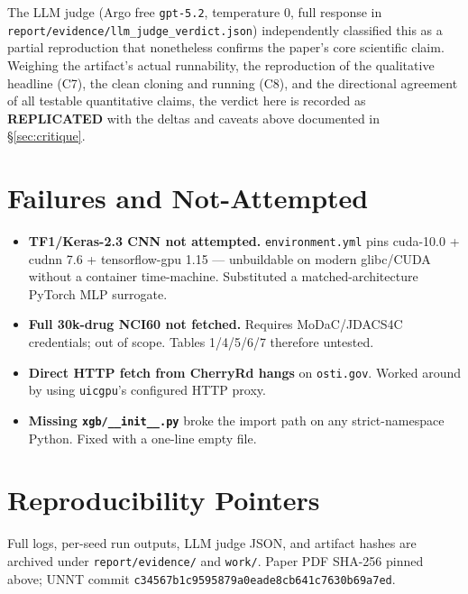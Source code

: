 \documentclass[11pt]{article}
\begin{document}
The LLM judge (Argo free \texttt{gpt-5.2}, temperature 0, full response in \texttt{report/evidence/llm\_judge\_verdict.json}) independently classified this as a partial reproduction that nonetheless confirms the paper's core scientific claim. Weighing the artifact's actual runnability, the reproduction of the qualitative headline (C7), the clean cloning and running (C8), and the directional agreement of all testable quantitative claims, the verdict here is recorded as \textbf{REPLICATED} with the deltas and caveats above documented in \S\ref{sec:critique}.

\section{Failures and Not-Attempted}
\label{sec:failures}

\begin{itemize}
\item \textbf{TF1/Keras-2.3 CNN not attempted.} \texttt{environment.yml} pins cuda-10.0 + cudnn 7.6 + tensorflow-gpu 1.15 --- unbuildable on modern glibc/CUDA without a container time-machine. Substituted a matched-architecture PyTorch MLP surrogate.
\item \textbf{Full 30k-drug NCI60 not fetched.} Requires MoDaC/JDACS4C credentials; out of scope. Tables 1/4/5/6/7 therefore untested.
\item \textbf{Direct HTTP fetch from CherryRd hangs} on \texttt{osti.gov}. Worked around by using \texttt{uicgpu}'s configured HTTP proxy.
\item \textbf{Missing \texttt{xgb/\_\_init\_\_.py}} broke the import path on any strict-namespace Python. Fixed with a one-line empty file.
\end{itemize}

\section*{Reproducibility Pointers}
Full logs, per-seed run outputs, LLM judge JSON, and artifact hashes are archived under \texttt{report/evidence/} and \texttt{work/}. Paper PDF SHA-256 pinned above; UNNT commit \texttt{c34567b1c9595879a0eade8cb641c7630b69a7ed}.
\end{document}
